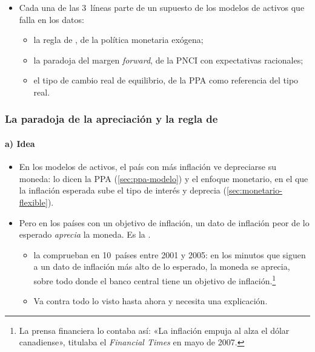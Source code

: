 \documentclass[11pt]{article}
\begin{document}
\begin{itemize}
\item Cada una de las 3~líneas parte de un supuesto de los modelos de activos que falla en los datos:
  \begin{itemize}
  \item la regla de , de la política monetaria exógena;
  \item la paradoja del margen \emph{forward}, de la PNCI con expectativas racionales;
  \item el tipo de cambio real de equilibrio, de la PPA como referencia del tipo real.
  \end{itemize}
\end{itemize}

\subsubsection{La paradoja de la apreciación y la regla de }\label{sec:taylor-tc}

\paragraph{a) Idea}
\begin{itemize}
\item En los modelos de activos, el país con más inflación ve depreciarse su moneda: lo dicen la PPA (\ref{sec:ppa-modelo}) y el enfoque monetario, en el que la inflación esperada sube el tipo de interés y deprecia (\ref{sec:monetario-flexible}).
\item Pero en los países con un objetivo de inflación, un dato de inflación peor de lo esperado \emph{aprecia} la moneda. Es la .
  \begin{itemize}
  \item \textcite{ClaridaWaldman2008} la comprueban en 10~países entre 2001 y 2005: en los minutos que siguen a un dato de inflación más alto de lo esperado, la moneda se aprecia, sobre todo donde el banco central tiene un objetivo de inflación.\footnote{La prensa financiera lo contaba así: «La inflación empuja al alza el dólar canadiense», titulaba el \emph{Financial Times} en mayo de 2007\nocite{Garnham2007Canadian}.}
  \item Va contra todo lo visto hasta ahora y necesita una explicación.
  \end{itemize}
\end{itemize}
\end{document}
